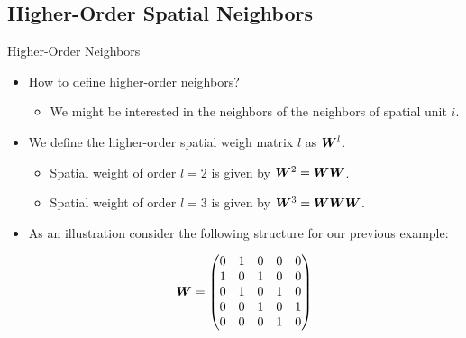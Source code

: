\documentclass[english,10pt]{beamer}\usepackage[]{graphicx}\usepackage[]{xcolor}
\begin{document}
\subsection{Higher-Order Spatial Neighbors}

\begin{frame}{Higher-Order Neighbors}
  \begin{itemize}
    \item How to define higher-order neighbors?
      \begin{itemize}
        \item We might be interested in the neighbors of the neighbors of spatial unit $i$.
      \end{itemize}
    \item We define the higher-order spatial weigh matrix $l$ as $\bm W^l$.
    \begin{itemize}
          \item Spatial weight of order $l = 2$ is given by $\bm W^2= \bm W\bm W$.
          \item Spatial weight of order $l = 3$ is given by $\bm W^3= \bm W\bm W\bm W$.
        \end{itemize}
    \item As an illustration consider the following structure for our previous example:


\begin{equation}\label{eq:W5x5}
\bm W = \begin{pmatrix}
      0 & 1 & 0 & 0 & 0 \\
      1 & 0 & 1 & 0 & 0 \\
      0 & 1 & 0 & 1 & 0 \\
      0 & 0 & 1 & 0 & 1 \\
      0 & 0 & 0 & 1 & 0
      \end{pmatrix}
\end{equation}
  \end{itemize}
\end{frame}
\end{document}
